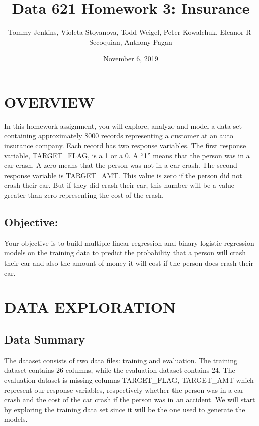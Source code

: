 \documentclass[]{article}
\title{Data 621 Homework 3: Insurance}
\author{Tommy Jenkins, Violeta Stoyanova, Todd Weigel, Peter Kowalchuk, Eleanor
R-Secoquian, Anthony Pagan}
\date{November 6, 2019}
\begin{document}
\maketitle

\section{OVERVIEW}\label{overview}

In this homework assignment, you will explore, analyze and model a data
set containing approximately 8000 records representing a customer at an
auto insurance company. Each record has two response variables. The
first response variable, TARGET\_FLAG, is a 1 or a 0. A ``1'' means that
the person was in a car crash. A zero means that the person was not in a
car crash. The second response variable is TARGET\_AMT. This value is
zero if the person did not crash their car. But if they did crash their
car, this number will be a value greater than zero representing the cost
of the crash.

\subsection{Objective:}\label{objective}

Your objective is to build multiple linear regression and binary
logistic regression models on the training data to predict the
probability that a person will crash their car and also the amount of
money it will cost if the person does crash their car.

\section{DATA EXPLORATION}\label{data-exploration}

\subsection{Data Summary}\label{data-summary}

The dataset consists of two data files: training and evaluation. The
training dataset contains 26 columns, while the evaluation dataset
contains 24. The evaluation dataset is missing columns TARGET\_FLAG,
TARGET\_AMT which represent our response variables, respectively whether
the person was in a car crash and the cost of the car crash if the
person was in an accident. We will start by exploring the training data
set since it will be the one used to generate the models.
\end{document}
